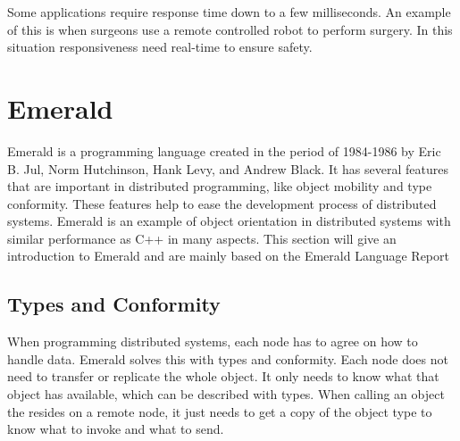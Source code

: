 Some applications require response time down to a few milliseconds. An example of this is when surgeons use a remote controlled robot to perform surgery. In this situation responsiveness need real-time to ensure safety. 








\section{Emerald}\label{Emerald}
Emerald is a programming language created in the period of 1984-1986 by Eric B. Jul, Norm Hutchinson, Hank Levy, and Andrew Black. It has several features that are important in distributed programming, like object mobility and type conformity. These features help to ease the development process of distributed systems. Emerald is an example of object orientation in distributed systems with similar performance as C++ in many aspects. This section will give an introduction to Emerald and are mainly based on the Emerald Language Report\cite{hutchinson_emerald_nodate}

\subsection{Types and Conformity}
When programming distributed systems, each node has to agree on how to handle data. Emerald solves this with types and conformity. Each node does not need to transfer or replicate the whole object. It only needs to know what that object has available, which can be described with types. When calling an object the resides on a remote node, it just needs to get a copy of the object type to know what to invoke and what to send. 

